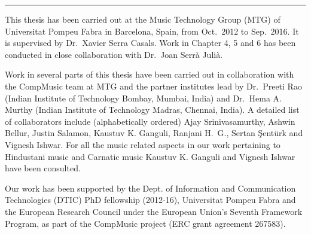 
\vspace*{\fill}


\begin{center}
	\rule{0.3\textwidth}{.4pt}
\end{center}

This thesis has been carried out at the Music Technology Group (MTG) of Universitat Pompeu Fabra in Barcelona, Spain, from Oct.~2012 to Sep.~2016.
It is supervised by Dr.~Xavier Serra Casals. Work in Chapter 4, 5 and 6 has been conducted in close collaboration with Dr.~Joan Serrà Julià. 

Work in several parts of this thesis have been carried out in collaboration with the CompMusic team at MTG and the partner institutes lead by Dr.~Preeti Rao (Indian Institute of Technology Bombay, Mumbai, India) and Dr.~Hema A. Murthy (Indian Institute of Technology Madras, Chennai, India). A detailed list of collaborators include (alphabetically ordered) Ajay Srinivasamurthy, Ashwin Bellur, Justin Salamon, Kaustuv K. Ganguli, Ranjani H.~G., Sertan Şentürk and Vignesh Ishwar. For all the music related aspects in our work pertaining to Hindustani music and Carnatic music Kaustuv K. Ganguli and Vignesh Ishwar have been consulted. 

Our work has been supported by the Dept. of Information and Communication Technologies (DTIC) PhD fellowship (2012-16), Universitat Pompeu Fabra and the European Research Council under the European Union’s Seventh Framework Program, as part of the CompMusic project (ERC grant agreement 267583).
